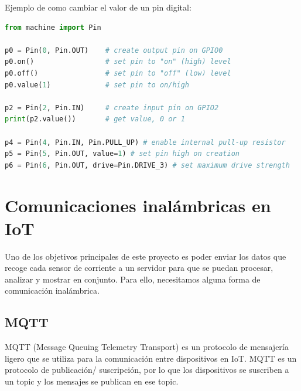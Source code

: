 \begin{titlepage}
Ejemplo de como cambiar el valor de un pin digital\cite{ref13}:
\begin{lstlisting}[language=Python]
from machine import Pin

p0 = Pin(0, Pin.OUT)    # create output pin on GPIO0
p0.on()                 # set pin to "on" (high) level
p0.off()                # set pin to "off" (low) level
p0.value(1)             # set pin to on/high

p2 = Pin(2, Pin.IN)     # create input pin on GPIO2
print(p2.value())       # get value, 0 or 1

p4 = Pin(4, Pin.IN, Pin.PULL_UP) # enable internal pull-up resistor
p5 = Pin(5, Pin.OUT, value=1) # set pin high on creation
p6 = Pin(6, Pin.OUT, drive=Pin.DRIVE_3) # set maximum drive strength

\end{lstlisting}
\section{Comunicaciones inalámbricas en IoT}
Uno de los objetivos principales de este proyecto es poder enviar los datos que recoge cada sensor de corriente a un servidor para que se puedan procesar, analizar y mostrar en conjunto. Para ello, necesitamos alguna forma de comunicación inalámbrica. \\
\subsection{MQTT}
MQTT (Message Queuing Telemetry Transport) \cite{ref14} es un protocolo de mensajería ligero que se utiliza para la comunicación entre dispositivos en IoT. MQTT es un protocolo de publicación/ suscripción, por lo que los dispositivos se suscriben a un topic y los mensajes se publican en ese topic. \\


\end{titlepage}
